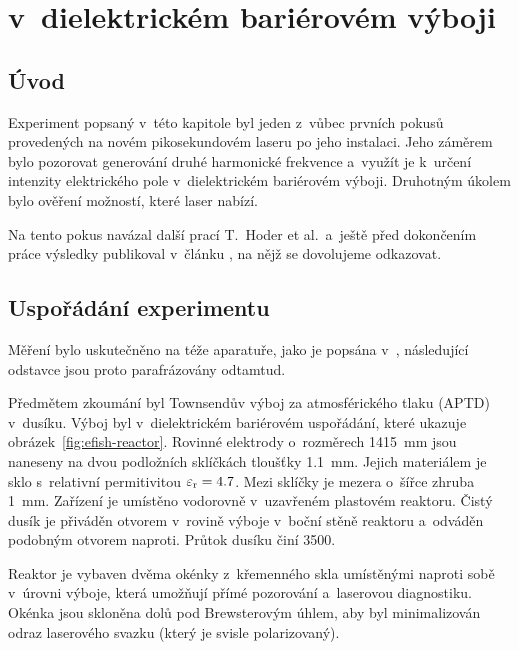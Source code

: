 \chapter[\EFISH]{{\EFISH} v~dielektrickém bariérovém výboji}

\newcommand\ypos{y}
\providecommand\efishmult{\alpha}
\providecommand\efishshift{P}

\section{Úvod}
\label{sec:efish-intro}
Experiment popsaný v~této kapitole byl jeden z~vůbec prvních pokusů
provedených na novém pikosekundovém laseru po jeho instalaci.
Jeho záměrem bylo pozorovat generování druhé harmonické frekvence
a~využít je k~určení intenzity elektrického pole v~dielektrickém
bariérovém výboji.
%
Druhotným úkolem bylo ověření možností, které laser nabízí.

Na tento pokus navázal další prací T.~Hoder et al.~a~ještě před
dokončením práce výsledky publikoval v~článku \cite{efish-nitrogen},
na nějž se dovolujeme odkazovat.

\section{Uspořádání experimentu}
\label{sec:efish-setup}
Měření bylo uskutečněno na téže aparatuře, jako je popsána
v~\cite{efish-nitrogen},
následující odstavce jsou proto parafrázovány odtamtud.

Předmětem zkoumání byl Townsendův výboj za atmosférického tlaku (APTD)
v~dusíku.
Výboj byl v~dielektrickém bariérovém uspořádání, které ukazuje
obrázek~\ref{fig:efish-reactor}.
Rovinné elektrody o~rozměrech \num{14}\times\SI{15}{\milli\metre}
jsou naneseny na dvou podložních sklíčkách tloušťky \SI{1.1}{\milli\metre}.
Jejich materiálem je sklo s~relativní permitivitou ${\varepsilon_\text{r} = \num{4.7}}$.
Mezi sklíčky je mezera o~šířce zhruba \SI{1}{\milli\metre}.
Zařízení je umístěno vodorovně v~uzavřeném plastovém reaktoru.
Čistý dusík je přiváděn otvorem v~rovině výboje v~boční stěně reaktoru
a~odváděn podobným otvorem naproti.
Průtok dusíku činí \SI{3500}{\sccm}.

Reaktor je vybaven dvěma okénky z~křemenného skla umístěnými naproti
sobě v~úrovni výboje,
která umožňují přímé pozorování a~laserovou diagnostiku.
Okénka jsou skloněna dolů pod Brewsterovým úhlem, aby byl minimalizován
odraz laserového svazku (který je svisle polarizovaný).

